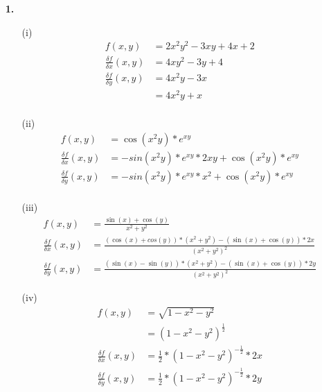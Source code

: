 \documentclass[a4paper,11pt,fleqn]{scrartcl}
\author{\authorinfo}
\title{\titleinfo}
\date{\today}
\begin{document}
\maketitle
\begin{enumerate}
    
\item[\textbf{1.}]
	\begin{itemize}
	\item[(i)]
		\begin{align*}
			f(x,y)&=2x^2y^2-3xy+4x+2\\
			\frac{\delta f}{\delta x}(x,y)&=4xy^2-3y+4\\
			\frac{\delta f}{\delta y}(x,y)&=4x^2y-3x\\
			&=4x^2y+x\\
		\end{align*}
	\item[(ii)]
		\begin{align*}
			f(x,y)&=\cos(x^2y)*e^{xy}\\
			\frac{\delta f}{\delta x}(x,y)&=-sin(x^2y)*e^{xy}*2xy+\cos(x^2y)*e^{xy}\\
			\frac{\delta f}{\delta y}(x,y)&=-sin(x^2y)*e^{xy}*x^2+\cos(x^2y)*e^{xy}\\
		\end{align*}
	\item[(iii)]
		\begin{align*}
			f(x,y)&=\frac{\sin(x)+\cos(y)}{x^2+y^2}\\
			\frac{\delta f}{\delta x}(x,y)&=\frac{ \left( \cos \left( x \right)+cos\left(y\right)\right)*\left(x^2+y^2\right)-\left(\sin(x)+\cos(y)\right)*2x }{\left(x^2+y^2\right)^2}\\
			\frac{\delta f}{\delta y}(x,y)&=\frac{\left(\sin (x)-\sin (y)\right)*\left(x^2+y^2\right)-\left(\sin(x)+\cos(y)\right)*2y}{\left(x^2+y^2\right)^2}
		\end{align*}
	\item[(iv)]
		\begin{align*}
			f(x,y)&=\sqrt{1-x^2-y^2}\\
			&=\left(1-x^2-y^2\right)^\frac{1}{2}\\
			\frac{\delta f}{\delta x}(x,y)&=\frac{1}{2}*\left(1-x^2-y^2\right)^{-\frac{1}{2}}*2x\\
			\frac{\delta f}{\delta y}(x,y)&=\frac{1}{2}*\left(1-x^2-y^2\right)^{-\frac{1}{2}}*2y
		\end{align*}
	\end{itemize}


\end{enumerate}
\end{document}
